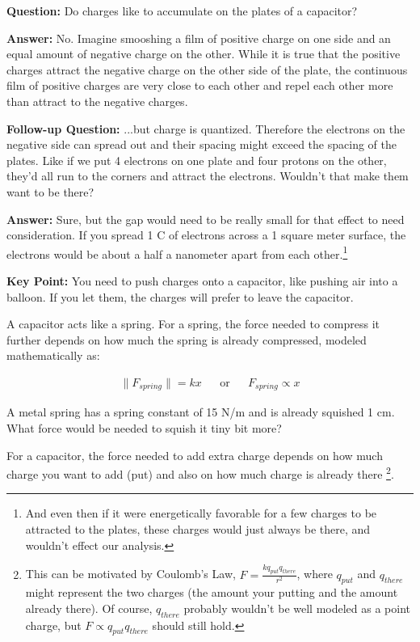 \textbf{Question:} Do charges like to accumulate on the plates of a capacitor?\par
\textbf{Answer:} No. Imagine smooshing a film of positive charge on one side and an equal amount of negative charge on the other. While it is true that the positive charges attract the negative charge on the other side of the plate, the continuous film of positive charges are very close to each other and repel each other more than attract to the negative charges.\par
\textbf{Follow-up Question:} ...but charge is quantized. Therefore the electrons on the negative side can spread out and their spacing might exceed the spacing of the plates. Like if we put 4 electrons on one plate and four protons on the other, they'd all run to the corners and attract the electrons. Wouldn't that make them want to be there? \par
\textbf{Answer:} Sure, but the gap would need to be really small for that effect to need consideration. If you spread 1 C of electrons across a 1 square meter surface, the electrons would be about a half a nanometer apart from each other.\footnote{And even then if it were energetically favorable for a few charges to be attracted to the plates, these charges would just always be there, and wouldn't effect our analysis.}\par
\textbf{Key Point:} You need to push charges onto a capacitor, like pushing air into a balloon. If you let them, the charges will prefer to leave the capacitor.\par

A capacitor acts like a spring. For a spring, the force needed to compress it further depends on how much the spring is already compressed, modeled mathematically as:\par

\begin{align}
\|F_{spring}\| = kx&& \text{or}&& F_{spring} \propto x
\end{align}

\begin{alevel}
A metal spring has a spring constant of 15 N/m and is already squished 1 cm. What force would be needed to squish it tiny bit more?
\end{alevel}

For a capacitor, the force needed to add extra charge depends on how much charge you want to add (put) and also on how much charge is already there \footnote{This can be motivated by Coulomb's Law, $F=\frac{kq_{put}q_{there}}{r^2}$, where $q_{put}$ and $q_{there}$ might represent the two charges (the amount your putting and the amount already there). Of course, $q_{there}$ probably wouldn't be well modeled as a point charge, but $F\propto q_{put}q_{there}$ should still hold. }.

